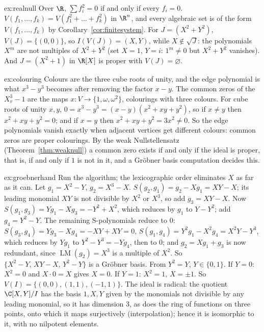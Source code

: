 \begin{solution}{ex:realnull}
\idea Over $\R$, $\sum f_i^2=0$ if and only if every $f_i=0$.
\writeup $V(f_1,\dots,f_k)=V(f_1^2+\dots+f_k^2)$ in $\R^n$, and every algebraic set is of the form $V(f_1,\dots,f_k)$ by Corollary~\ref{cor:finitesystem}. For $J=(X^2+Y^2)$, $V(J)=\{(0,0)\}$, so $I(V(J))=(X,Y)$, while $X\notin\sqrt J$:
the polynomials $X^m$ are not multiples of $X^2+Y^2$ (set $X=1$, $Y=i$: $1^m\ne0$ but $X^2+Y^2$ vanishes). And $J=(X^2+1)$ in $\R[X]$ is proper with $V(J)=\varnothing$.
\end{solution}

\begin{solution}{ex:colouring}
\idea Colours are the three cube roots of unity, and the edge polynomial is what $x^3-y^3$ becomes after removing the factor $x-y$.
\writeup The common zeros of the $X_v^3-1$ are the maps $x\colon V\to\{1,\omega,\omega^2\}$, colourings with three colours. For cube roots of unity $x,y$, $0=x^3-y^3=(x-y)(x^2+xy+y^2)$, so if $x\ne y$ then $x^2+xy+y^2=0$;
and if $x=y$ then $x^2+xy+y^2=3x^2\ne0$. So the edge polynomials vanish exactly when adjacent vertices get different colours: common zeros are proper colourings. By the weak Nullstellensatz (Theorem~\ref{thm:weaknull}) a common zero
exists if and only if the ideal is proper, that is, if and only if $1$ is not in it, and a Gröbner basis computation decides this.
\end{solution}

\begin{solution}{ex:groebnerhand}
\idea Run the algorithm; the lexicographic order eliminates $X$ as far as it can.
\writeup Let $g_1=X^2-Y$, $g_2=X^3-X$. $S(g_2,g_1)=g_2-Xg_1=XY-X$; its leading monomial $XY$ is not divisible by $X^2$ or $X^3$, so add $g_3=XY-X$. Now $S(g_1,g_3)=Yg_1-Xg_3=-Y^2+X^2$, which reduces by $g_1$ to $Y-Y^2$; add
$g_4=Y^2-Y$. The remaining S-polynomials reduce to $0$: $S(g_3,g_4)=Yg_3-Xg_4=-XY+XY=0$, $S(g_1,g_4)=Y^2g_1-X^2g_4=X^2Y-Y^3$, which reduces by $Yg_1$ to $Y^2-Y^3=-Yg_4$, then to $0$; and $g_2=Xg_1+g_3$ is now redundant,
since $\operatorname{LM}(g_2)=X^3$ is a multiple of $X^2$. So $\{X^2-Y,\,XY-X,\,Y^2-Y\}$ is a Gröbner basis. From $Y^2=Y$, $Y\in\{0,1\}$. If $Y=0$: $X^2=0$ and $X\cdot0=X$ gives $X=0$. If $Y=1$: $X^2=1$, $X=\pm1$. So $V(I)=\{(0,0),(1,1),(-1,1)\}$. The
ideal is radical: the quotient $\C[X,Y]/I$ has the basis $1,X,Y$ given by the monomials not divisible by any leading monomial, so it has dimension $3$, as does the ring of functions on three points, onto which it maps
surjectively (interpolation); hence it is isomorphic to it, with no nilpotent elements.
\end{solution}

